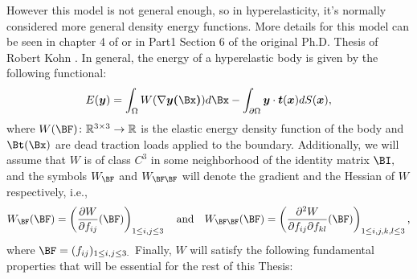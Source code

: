 
However this model is not general enough, so in hyperelasticity, it's normally considered more general density energy functions. More details for this model can be seen in chapter 4 of \cite{MSP} or in  Part1 Section 6 of the original Ph.D. Thesis of Robert Kohn \cite{KohnThesis}. In general, the energy of a hyperelastic body is given by the following functional:
\begin{equation}
    \label{2.1}
    E(\boldsymbol{y})=\int_{\Omega} W(\nabla \boldsymbol{y(\Bx)}) d \Bx -\int_{\partial \Omega} \boldsymbol{y} \cdot \boldsymbol{t}(\boldsymbol{x}) d S(\boldsymbol{x}),
\end{equation}
    where $W(\BF)\colon\mathbb R^{3\times 3}\to\mathbb R$ is the elastic energy density function of the body and $\Bt(\Bx)$ are dead traction loads applied to the boundary. Additionally, we will assume that $W$ is of class $C^3$ in some neighborhood of the identity matrix $\BI,$ and the symbols $W_{\BF}$ and $W_{\BF\BF}$ will denote the gradient and the Hessian of $W$ respectively, i.e.,
    $$
    W_{\BF}(\BF)=\left(\frac{\partial W}{\partial f_{ij}}(\BF)\right)_{1\leq i,j\leq 3} \quad\text{and} \quad
    W_{\BF\BF}(\BF)=\left(\frac{\partial^2 W}{\partial f_{ij}\partial f_{kl}}(\BF)\right)_{1\leq i,j,k,l\leq 3},
    $$
    where $\BF=(f_{ij})_{1\leq i,j\leq 3.}$ Finally, $W$ will satisfy the following fundamental properties that will be essential for the rest of this Thesis:
    
